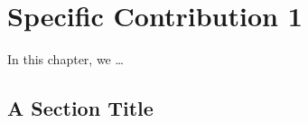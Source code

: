 \documentclass[../thesis.tex]{subfiles}
\begin{document}
\chapter{Specific Contribution 1}
\label{ch:specific1}
In this chapter, we \ldots
\section{A Section Title}
\lipsum[16]
\end{document}
